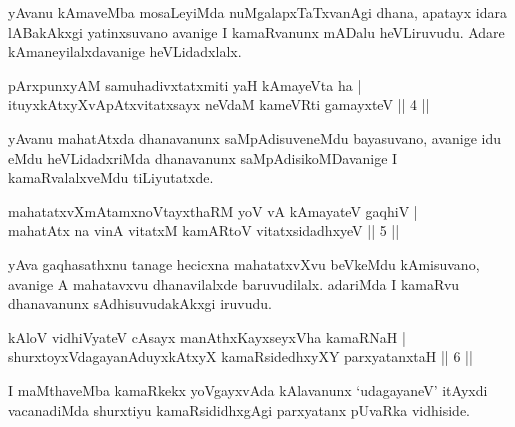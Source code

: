\begin{artha}
yAvanu kAmaveMba mosaLeyiMda nuMgalapxTaTxvanAgi dhana, apatayx idara lABakAkxgi yatinxsuvano avanige I kamaRvanunx mADalu heVLiruvudu. Adare kAmaneyilalxdavanige heVLidadxlalx.
\end{artha}


\begin{shl}
pArxpunxyAM samuhadivxtatxmiti yaH kAmayeVta ha | \\
ituyxkAtxyX\s vApAtxvitatxsayx neVdaM kameVRti gamayxteV \hfill|| 4 || 
\end{shl}

\begin{artha}
yAvanu mahatAtxda dhanavanunx saMpAdisuveneMdu bayasuvano, avanige idu eMdu heVLidadxriMda dhanavanunx saMpAdisikoMDavanige I kamaRvalalxveMdu tiLiyutatxde.
\end{artha}


\begin{shl}
mahatatxvXmAtamxnoV\s tayxthaRM yoV vA kAmayateV gaqhiV | \\
mahatAtx na vinA vitatxM kamARtoV vitatxsidadhxyeV \hfill|| 5 || 
\end{shl}

\begin{artha}
yAva gaqhasathxnu tanage hecicxna mahatatxvXvu beVkeMdu kAmisuvano, avanige A mahatavxvu dhanavilalxde baruvudilalx. adariMda I kamaRvu dhanavanunx sAdhisuvudakAkxgi iruvudu.
\end{artha}


\begin{shl}
kAloV vidhiVyateV cAsayx manAthxKayxseyxVha kamaRNaH | \\
shurxtoyxVdagayanAduyxkAtxyX kamaRsidedhxyXY parxyatanxtaH \hfill|| 6 || 
\end{shl}

\begin{artha}
I maMthaveMba kamaRkekx yoVgayxvAda kAlavanunx `udagayaneV' itAyxdi vacanadiMda shurxtiyu kamaRsididhxgAgi parxyatanx pUvaRka vidhiside.
\end{artha}


